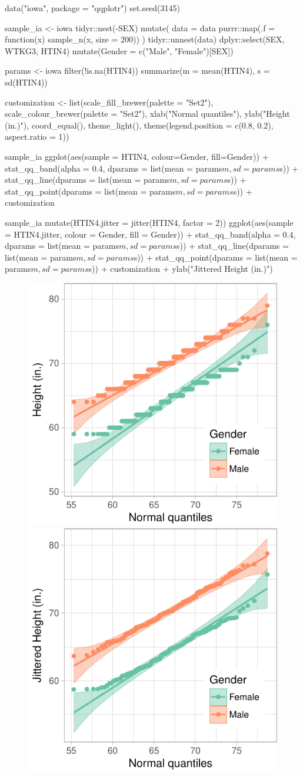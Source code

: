 \begin{Schunk}
\begin{Sinput}
data("iowa", package = "qqplotr")
set.seed(3145)

sample_ia <- iowa %
  tidyr::nest(-SEX) %
  mutate(
    data = data %
    purrr::map(.f = function(x) sample_n(x, size = 200))
    ) %
  tidyr::unnest(data) %
  dplyr::select(SEX, WTKG3, HTIN4) %
  mutate(Gender = c("Male", "Female")[SEX])

params <- iowa %
  filter(!is.na(HTIN4)) %
  summarize(m = mean(HTIN4), s = sd(HTIN4))

customization <- list(scale_fill_brewer(palette = "Set2"),
                      scale_colour_brewer(palette = "Set2"),
                      xlab("Normal quantiles"),
                      ylab("Height (in.)"),
                      coord_equal(),
                      theme_light(),
                      theme(legend.position = c(0.8, 0.2), aspect.ratio = 1))

sample_ia %
  ggplot(aes(sample = HTIN4, colour=Gender, fill=Gender)) + 
  stat_qq_band(alpha = 0.4,
               dparams = list(mean = params$m, sd = params$s)) + 
  stat_qq_line(dparams = list(mean = params$m, sd = params$s)) + 
  stat_qq_point(dparams = list(mean = params$m, sd = params$s)) +
  customization

sample_ia %
  mutate(HTIN4.jitter = jitter(HTIN4, factor = 2)) %
  ggplot(aes(sample = HTIN4.jitter, colour = Gender, fill = Gender)) + 
  stat_qq_band(alpha = 0.4,
               dparams = list(mean = params$m, sd = params$s)) +
  stat_qq_line(dparams = list(mean = params$m, sd = params$s)) + 
  stat_qq_point(dparams = list(mean = params$m, sd = params$s)) +
  customization +
  ylab("Jittered Height (in.)") 
\end{Sinput}
\begin{figure}

{\centering \includegraphics[width=0.4\linewidth]{loy-figures/heights-1} \includegraphics[width=0.4\linewidth]{loy-figures/heights-2} 

}
\end{figure}
\end{Schunk}
